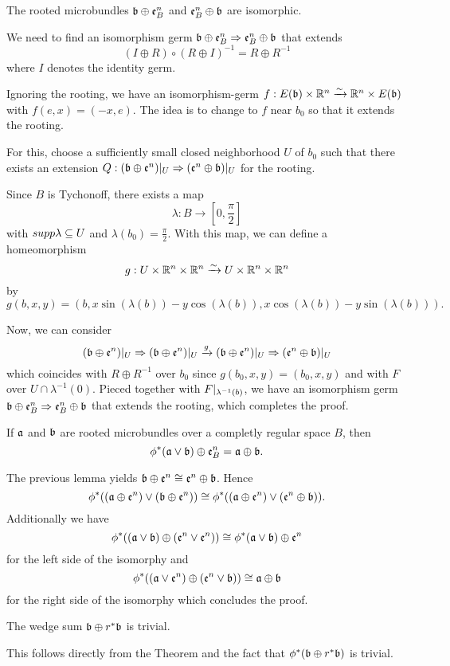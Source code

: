 \begin{mylemma}\label{suspension::commutativity}%
    The rooted microbundles $\mathfrak{b} \oplus \mathfrak{e}^n_B$ and $\mathfrak{e}^n_B \oplus \mathfrak{b}$ are isomorphic. 
\end{mylemma}
\begin{myproof}
    We need to find an isomorphism germ $\mathfrak{b} \oplus \mathfrak{e}^n_B \Rightarrow{} \mathfrak{e}^n_B \oplus \mathfrak{b}$ that extends
    \[ (I \oplus R) \circ (R \oplus I)^{-1} = R \oplus R^{-1} \]
    where $I$ denotes the identity germ.

    Ignoring the rooting, we have an isomorphism-germ $f: E(\mathfrak{b}) \times \mathbb{R}^n \xrightarrow{\sim} \mathbb{R}^n \times E(\mathfrak{b})$ with $f(e, x) = (-x, e)$.
    The idea is to change to $f$ near $b_0$ so that it extends the rooting.

    For this, choose a sufficiently small closed neighborhood $U$ of $b_0$
    such that there exists an extension $Q: (\mathfrak{b} \oplus \mathfrak{e}^n)\vert_{U} \Rightarrow{} (\mathfrak{e}^n \oplus \mathfrak{b})\vert_{U}$ for the rooting.

    Since $B$ is Tychonoff, there exists a map
    \[ \lambda: B \to [0, \frac{\pi}{2}] \]
    with $supp \lambda \subseteq{} U$ and $\lambda(b_0) = \frac{\pi}{2}$.
    With this map, we can define a homeomorphism
    \[ g: U \times \mathbb{R}^n \times \mathbb{R}^n \xrightarrow{\sim} U \times \mathbb{R}^n \times \mathbb{R}^n \]
    by
    \[ g(b, x, y) = (b, x \sin(\lambda(b)) - y \cos(\lambda(b)), x \cos(\lambda(b)) - y \sin(\lambda(b))). \]

    Now, we can consider
    \[ (\mathfrak{b} \oplus \mathfrak{e}^n)\vert_{U} \Rightarrow{} (\mathfrak{b} \oplus \mathfrak{e}^n)\vert_{U} \xrightarrow{g} (\mathfrak{b} \oplus \mathfrak{e}^n)\vert_{U} \Rightarrow{} (\mathfrak{e}^n \oplus \mathfrak{b})\vert_{U}\]
    which coincides with $R \oplus R^{-1}$ over $b_0$ since $g(b_0, x, y) = (b_0, x, y)$ and with $F$ over $U \cap \lambda^{-1}(0)$.
    Pieced together with $F\vert_{\lambda^{-1}(b)}$, we have an isomorphism germ $\mathfrak{b} \oplus \mathfrak{e}^n_B \Rightarrow{} \mathfrak{e}^n_B \oplus \mathfrak{b}$ that extends the rooting, which completes the proof.
\end{myproof}

\begin{mytheorem}
    If $\mathfrak{a}$ and $\mathfrak{b}$ are rooted microbundles over a completly regular space $B$, then
    \[ \phi^*(\mathfrak{a} \vee \mathfrak{b}) \oplus \mathfrak{e}^n_B = \mathfrak{a} \oplus \mathfrak{b}. \]
\end{mytheorem}
\begin{myproof}
    The previous lemma yields $\mathfrak{b} \oplus \mathfrak{e}^n \cong \mathfrak{e}^n \oplus \mathfrak{b}$.
    Hence
    \[ \phi^*((\mathfrak{a} \oplus \mathfrak{e}^n) \vee (\mathfrak{b} \oplus \mathfrak{e}^n)) \cong \phi^*((\mathfrak{a} \oplus \mathfrak{e}^n) \vee (\mathfrak{e}^n \oplus \mathfrak{b})). \]
    Additionally we have
    \[ \phi^*((\mathfrak{a} \vee \mathfrak{b}) \oplus (\mathfrak{e}^n \vee \mathfrak{e}^n)) \cong \phi^*(\mathfrak{a} \vee \mathfrak{b}) \oplus \mathfrak{e}^n \]
    for the left side of the isomorphy and
    \[ \phi^*((\mathfrak{a} \vee \mathfrak{e}^n) \oplus (\mathfrak{e}^n \vee \mathfrak{b})) \cong \mathfrak{a} \oplus \mathfrak{b}\]
    for the right side of the isomorphy which concludes the proof.
\end{myproof}

\begin{mycorollary}
    The wedge sum $\mathfrak{b} \oplus r^*\mathfrak{b}$ is trivial.
\end{mycorollary}
\begin{myproof}
    This follows directly from the Theorem and the fact that $\phi^*(\mathfrak{b} \oplus r^*\mathfrak{b})$ is trivial.
\end{myproof}

